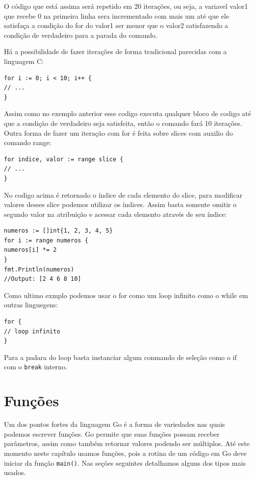 \documentclass{SBCbookchapter}
\begin{document}
O código que está assima será repetido em 20 iterações, ou seja, a variavel valor1 que recebe 0 na primeira linha sera incrementado com mais um até que ele satisfaça a condição do for do valor1 ser menor que o valor2 satisfazendo a condição de verdadeiro para a parada do comando.

Há a possibilidade de fazer iterações de forma tradicional parecidas com a linguagem C: 

\begin{lstlisting}
for i := 0; i < 10; i++ {
// ...
}
\end{lstlisting}

Assim como no exemplo anterior esse codigo executa qualquer bloco de codigo até que a condição de verdadeiro seja satisfeita, então o comando fará 10 iterações. Outra forma de fazer um iteração com for é feita sobre slices com auxilio do comando range:

\begin{lstlisting}
for indice, valor := range slice {
// ...
}
\end{lstlisting}

No codigo acima é retornado o índice de cada elemento do slice, para modificar valores desses slice podemos utilizar os índices. Assim basta somente omitir o segundo valor na atribuição e acessar cada elemento
através de seu índice: 


\begin{lstlisting}
numeros := []int{1, 2, 3, 4, 5}
for i := range numeros {
numeros[i] *= 2
}
fmt.Println(numeros)
//Output: [2 4 6 8 10]
\end{lstlisting}

Como ultimo exmplo podemos usar o for como um loop infinito como o while em outras linguegens:
\begin{lstlisting}
for {
// loop infinito
}
\end{lstlisting}
Para a padara do loop basta instanciar algum conmando de seleção como o if com o \texttt{break} interno.

\section{Funções}

Um dos pontos fortes da linguagem Go é a forma de variedades nas quais podemos escrever funções. Go permite que suas funções possam receber parâmetros, assim como também retornar valores podendo ser múltiplos. Até este momento neste capítulo usamos funções, pois a rotina de um código em Go deve iniciar da função \texttt{main()}. Nas seções seguintes detalhamos alguns dos tipos mais usados.
\end{document}

